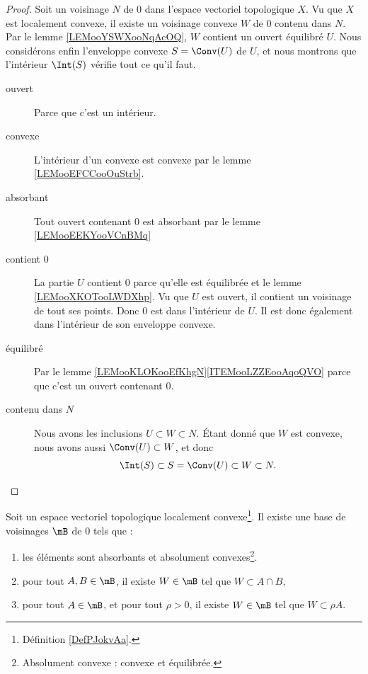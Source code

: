 \begin{proof}
	Soit un voisinage \( N\) de \( 0\) dans l'espace vectoriel topologique \( X\). Vu que \( X\) est localement convexe, il existe un voisinage convexe \( W\) de \( 0\) contenu dans \( N\). Par le lemme \ref{LEMooYSWXooNqAcOQ}, \( W\) contient un ouvert équilibré \( U\). Nous considérons enfin l'enveloppe convexe \( S=\Conv(U)\) de \( U\), et nous montrons que l'intérieur \( \Int(S)\) vérifie tout ce qu'il faut.

	\begin{description}
		\item[ouvert] Parce que c'est un intérieur.
		\item[convexe] L'intérieur d'un convexe est convexe par le lemme \ref{LEMooEFCCooOuStrb}.
		\item[absorbant] Tout ouvert contenant \( 0\) est absorbant par le lemme \ref{LEMooEEKYooVCnBMq}
		\item[contient \( 0\)] La partie \( U\) contient \( 0\) parce qu'elle est équilibrée et le lemme \ref{LEMooXKOTooLWDXhp}. Vu que \( U\) est ouvert, il contient un voisinage de tout ses points. Donc \( 0\) est dans l'intérieur de \( U\). Il est donc également dans l'intérieur de son enveloppe convexe.
		\item[équilibré] Par le lemme \ref{LEMooKLOKooEfKhgN}\ref{ITEMooLZZEooAqoQVO} parce que c'est un ouvert contenant \( 0\).
		\item[contenu dans \( N\)] Nous avons les inclusions \( U\subset W\subset N\). Étant donné que \( W\) est convexe, nous avons aussi \( \Conv(U)\subset W\), et donc
		      \begin{equation}
			      \Int(S)\subset S=\Conv(U)\subset W\subset N.
		      \end{equation}
	\end{description}
\end{proof}

\begin{theorem}		\label{THOooPTLOooJLaHGE}
	Soit un espace vectoriel topologique localement convexe\footnote{Définition \ref{DefPJokvAa}.}. Il existe une base de voisinages \( \mB\) de \( 0\) tels que :
	\begin{enumerate}
		\item
		      les éléments sont absorbants et absolument convexes\footnote{Absolument convexe : convexe et équilibrée.}.
		\item
		      pour tout \( A,B\in \mB\), il existe \( W\in \mB\) tel que \( W\subset A\cap B\),
		\item
		      pour tout \( A\in \mB\), et pour tout \( \rho>0\), il existe \( W\in \mB\) tel que \( W\subset \rho A\).
	\end{enumerate}
\end{theorem}

